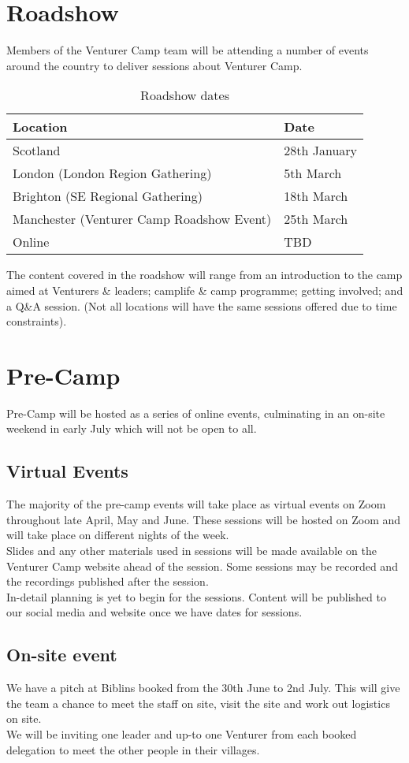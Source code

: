 \chapter{Roadshow}
Members of the Venturer Camp team will be attending a number of events around the country to deliver sessions about Venturer Camp.
\begin{table}[H]
    \centering
    \begin{tabularx}{\textwidth}{XX}
        \textbf{Location} & \textbf{Date}\\
        \hline
        \hline
        Scotland & 28th January\\
        \hline
        London (London Region Gathering) & 5th March\\
        \hline
        Brighton (SE Regional Gathering) & 18th March\\
        \hline
        Manchester (Venturer Camp Roadshow Event) & 25th March\\
        \hline
        Online & TBD\\
        \hline
    \end{tabularx}
    \caption{Roadshow dates}
\end{table}

The content covered in the roadshow will range from an introduction to the camp aimed at Venturers \& leaders; camplife \& camp programme; getting involved; and a Q\&A session. (Not all locations will have the same sessions offered due to time constraints).

\chapter{Pre-Camp}
Pre-Camp will be hosted as a series of online events, culminating in an on-site weekend in early July which will not be open to all.
\section{Virtual Events}
The majority of the pre-camp events will take place as virtual events on Zoom throughout late April, May and June. These sessions will be hosted on Zoom and will take place on different nights of the week.\\

Slides and any other materials used in sessions will be made available on the Venturer Camp website ahead of the session. Some sessions may be recorded and the recordings published after the session.\\

In-detail planning is yet to begin for the sessions. Content will be published to our social media and website once we have dates for sessions.

\section{On-site event}
We have a pitch at Biblins booked from the 30th June to 2nd July. This will give the team a chance to meet the staff on site, visit the site and work out logistics on site.\\

We will be inviting one leader and up-to one Venturer from each booked delegation to meet the other people in their villages.
